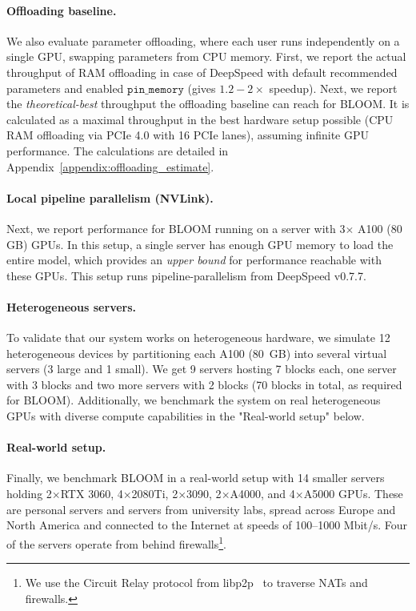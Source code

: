 \paragraph{Offloading baseline.} We also evaluate parameter offloading, where each user runs independently on a single GPU, swapping parameters from CPU memory.
First, we report the actual throughput of RAM offloading in case of DeepSpeed with default recommended parameters and enabled $\texttt{pin\_memory}$ (gives $1.2{-}2\times$ speedup).
Next, we report the \textit{theoretical-best} throughput the offloading baseline can reach for BLOOM. It is calculated as a maximal throughput in the best hardware setup possible (CPU RAM offloading via PCIe 4.0 with 16 PCIe lanes), assuming infinite GPU performance. The calculations are detailed in Appendix~\ref{appendix:offloading_estimate}.

\paragraph{Local pipeline parallelism (NVLink).} Next, we report performance for BLOOM running on a server with 3$\times$ A100 (80 GB) GPUs. In this setup, a single server has enough GPU memory to load the entire model, which provides an \textit{upper bound} for performance reachable with these GPUs. This setup runs pipeline-parallelism from DeepSpeed v0.7.7.

\paragraph{Heterogeneous servers.} To validate that our system works on heterogeneous hardware, we simulate 12 heterogeneous devices by partitioning each A100 (80~GB) into several virtual servers (3 large and 1 small). We get 9 servers hosting 7 blocks each, one server with 3 blocks and two more servers with 2 blocks (70 blocks in total, as required for BLOOM). Additionally, we benchmark the system on real heterogeneous GPUs with diverse compute capabilities in the "Real-world setup" below.

\paragraph{Real-world setup.} Finally, we benchmark BLOOM in a real-world setup with 14 smaller servers holding 2$\times$RTX 3060, 4$\times$2080Ti, 2$\times$3090, 2$\times$A4000, and 4$\times$A5000 GPUs. These are personal servers and servers from university labs, spread across Europe and North America and connected to the Internet at speeds of 100--1000 Mbit/s. Four of the servers operate from behind firewalls\footnote{We use the Circuit Relay protocol from libp2p~\citep{libp2p-circuit-relay} to traverse NATs and firewalls.}.

